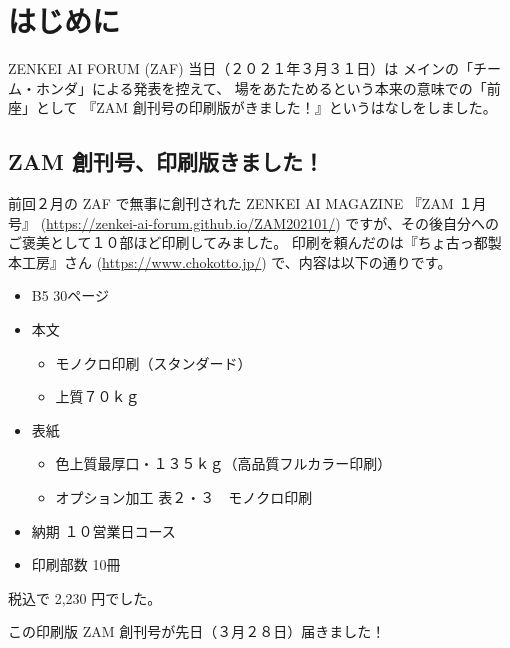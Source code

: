 \documentclass[dvipdfmx,autodetect-engine,10pt,b5paper,papersize,openany,dvipsnames]{jsbook}
\begin{document}
\chapter{はじめに}
\label{ch:zenza}
\thispagestyle{fancy}

ZENKEI AI FORUM (ZAF) 当日（２０２１年３月３１日）は
メインの「チーム・ホンダ」による発表を控えて、
場をあたためるという本来の意味での「前座」として
『ZAM 創刊号の印刷版がきました！』というはなしをしました。

\begin{multicols}{2}

\section*{ZAM 創刊号、印刷版きました！}
前回２月の ZAF で無事に創刊された ZENKEI AI MAGAZINE
『ZAM １月号』
(\url{https://zenkei-ai-forum.github.io/ZAM202101/})
ですが、その後自分へのご褒美として１０部ほど印刷してみました。
印刷を頼んだのは『ちょ古っ都製本工房』さん
(\url{https://www.chokotto.jp/})
で、内容は以下の通りです。
{\small
\begin{itemize}
  \item B5 30ページ
  \item 本文
  \begin{itemize}
    \item モノクロ印刷（スタンダード）
    \item 上質７０ｋｇ
  \end{itemize}
  \item 表紙
  \begin{itemize}
    \item 色上質最厚口・１３５ｋｇ（高品質フルカラー印刷）
    \item オプション加工 表２・３　モノクロ印刷
  \end{itemize}
  \item 納期 １０営業日コース
  \item 印刷部数 10冊
\end{itemize}
}
税込で 2,230 円でした。

この印刷版 ZAM 創刊号が先日（３月２８日）届きました！




\end{multicols}
\end{document}
